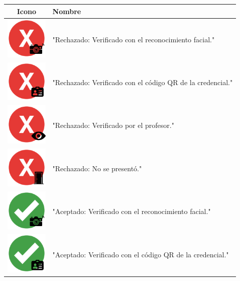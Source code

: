 \begin{table}[h!]
	\centering
	\begin{tabular}{|c|l|}
		\hline
		\textbf{Icono} & \textbf{Nombre} \\
		\hline
		\includegraphics[width=2cm]{images/icono1.png} & "Rechazado: Verificado con el reconocimiento facial." \\
		\hline
		\includegraphics[width=2cm]{images/icono2.png} & "Rechazado: Verificado con el código QR de la credencial." \\
		\hline
		\includegraphics[width=2cm]{images/icono3.png} & "Rechazado: Verificado por el profesor." \\
		\hline
		\includegraphics[width=2cm]{images/icono4.png} & "Rechazado: No se presentó." \\
		\hline
		\includegraphics[width=2cm]{images/icono5.png} & "Aceptado: Verificado con el reconocimiento facial." \\
		\hline
		\includegraphics[width=2cm]{images/icono6.png} & "Aceptado: Verificado con el código QR de la credencial." \\

\end{tabular}
\end{table}
